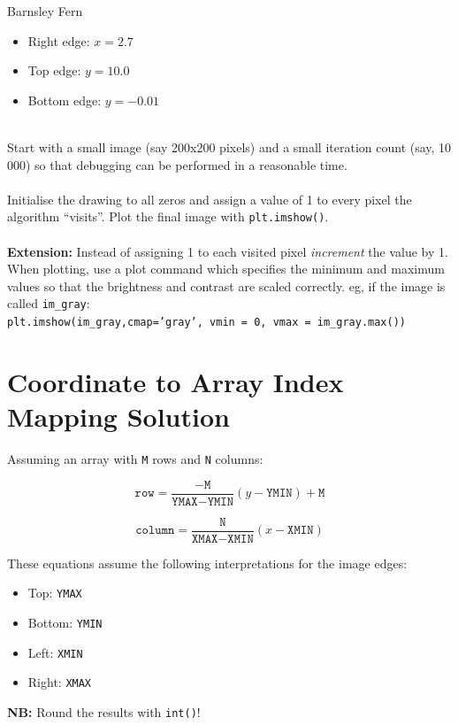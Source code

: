 \documentclass{lab}
\begin{document}
\begin{task}{Barnsley Fern}{}
\begin{itemize}
\item Right edge: $x=2.7$
\item Top edge: $y=10.0$
\item Bottom edge: $y=-0.01$
\end{itemize}
~\\
Start with a small image (say 200x200 pixels) and a small iteration count (say, 10 000) so that debugging can be performed in a reasonable time.
\\~\\
Initialise the drawing to all zeros and assign a value of 1 to every pixel the algorithm ``visits''. Plot the final image with \texttt{plt.imshow()}.
\\~\\
\textbf{Extension:} Instead of assigning 1 to each visited pixel \textit{increment} the value by 1. When plotting, use a plot command which specifies the minimum and maximum values so that the brightness and contrast are scaled correctly. eg, if the image is called \texttt{im\_gray}:\\ \texttt{plt.imshow(im\_gray,cmap='gray', vmin = 0, vmax = im\_gray.max())}
\end{task}

\section*{Coordinate to Array Index Mapping Solution}

Assuming an array with \texttt{M} rows and \texttt{N} columns:


\begin{equation}
\texttt{row} = \frac{-\texttt{M}}{\texttt{YMAX}-\texttt{YMIN}}(y-\texttt{YMIN}) + \texttt{M}
\end{equation}

\begin{equation}
\texttt{column} = \frac{\texttt{N}}{\texttt{XMAX}-\texttt{XMIN}}(x-\texttt{XMIN}) 
\end{equation}

These equations assume the following interpretations for the image edges:

\begin{itemize}
\item Top: \texttt{YMAX}
\item Bottom: \texttt{YMIN}
\item Left: \texttt{XMIN}
\item Right: \texttt{XMAX}
\end{itemize}

\textbf{NB:} Round the results with \texttt{int()}!
\end{document}
